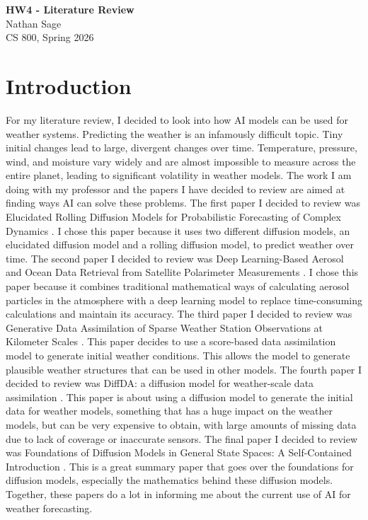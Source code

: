 \documentclass[12pt]{article}
\begin{document}
\begin{centering}
{\large\textbf{HW4 - Literature Review}}\\
\vspace{3mm} %
Nathan Sage\\
CS 800, Spring 2026\\
\end{centering}



\section{Introduction}
For my literature review, I decided to look into how AI models can be used for weather systems.  Predicting the weather is an infamously difficult topic.  Tiny initial changes lead to large, divergent changes over time. Temperature, pressure, wind, and moisture vary widely and are almost impossible to measure across the entire planet, leading to significant volatility in weather models.  The work I am doing with my professor and the papers I have decided to review are aimed at finding ways AI can solve these problems.  The first paper I decided to review was Elucidated Rolling Diffusion Models for Probabilistic Forecasting of Complex Dynamics \cite{cachay2025elucidated}. I chose this paper because it uses two different diffusion models, an elucidated diffusion model and a rolling diffusion model, to predict weather over time. The second paper I decided to review was Deep Learning-Based Aerosol and Ocean Data Retrieval from Satellite Polarimeter Measurements \cite{wang2025deeplearning}.  I chose this paper because it combines traditional mathematical ways of calculating aerosol particles in the atmosphere with a deep learning model to replace time-consuming calculations and maintain its accuracy. The third paper I decided to review was Generative Data Assimilation of Sparse Weather Station Observations at Kilometer Scales \cite{manshausen2025generative}. This paper decides to use a score-based data assimilation model to generate initial weather conditions.  This allows the model to generate plausible weather structures that can be used in other models.  The fourth paper I decided to review was DiffDA: a diffusion model for weather-scale data assimilation \cite{huang2024diffda}.  This paper is about using a diffusion model to generate the initial data for weather models, something that has a huge impact on the weather models, but can be very expensive to obtain, with large amounts of missing data due to lack of coverage or inaccurate sensors.  The final paper I decided to review was Foundations of Diffusion Models in General State Spaces: A Self-Contained Introduction \cite{pauline2025foundations}. This is a great summary paper that goes over the foundations for diffusion models, especially the mathematics behind these diffusion models. Together, these papers do a lot in informing me about the current use of AI for weather forecasting.
\end{document}
